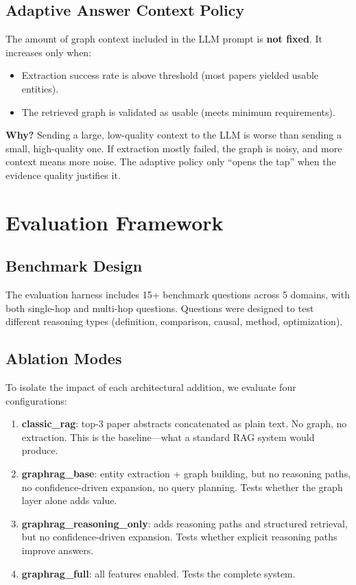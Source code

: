 \documentclass[11pt]{article}
\begin{document}
\subsection{Adaptive Answer Context Policy}

The amount of graph context included in the LLM prompt is \textbf{not fixed}. It increases only when:
\begin{itemize}[leftmargin=1.2em]
  \item Extraction success rate is above threshold (most papers yielded usable entities).
  \item The retrieved graph is validated as usable (meets minimum requirements).
\end{itemize}

\textbf{Why?} Sending a large, low-quality context to the LLM is worse than sending a small, high-quality one. If extraction mostly failed, the graph is noisy, and more context means more noise. The adaptive policy only ``opens the tap'' when the evidence quality justifies it.

\section{Evaluation Framework}

\subsection{Benchmark Design}

The evaluation harness includes 15+ benchmark questions across 5 domains, with both single-hop and multi-hop questions. Questions were designed to test different reasoning types (definition, comparison, causal, method, optimization).

\subsection{Ablation Modes}

To isolate the impact of each architectural addition, we evaluate four configurations:

\begin{enumerate}[leftmargin=1.2em]
  \item \textbf{classic\_rag}: top-3 paper abstracts concatenated as plain text. No graph, no extraction. This is the baseline---what a standard RAG system would produce.
  \item \textbf{graphrag\_base}: entity extraction + graph building, but no reasoning paths, no confidence-driven expansion, no query planning. Tests whether the graph layer alone adds value.
  \item \textbf{graphrag\_reasoning\_only}: adds reasoning paths and structured retrieval, but no confidence-driven expansion. Tests whether explicit reasoning paths improve answers.
  \item \textbf{graphrag\_full}: all features enabled. Tests the complete system.
\end{enumerate}
\end{document}
